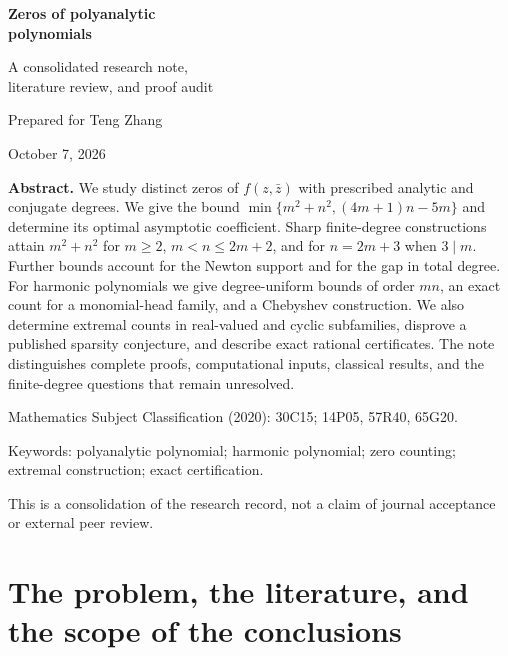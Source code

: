\documentclass[UTF8,11pt]{ctexart}
\theoremstyle{definition}
\numberwithin{equation}{section}
\begin{document}
\begin{titlepage}
\centering
\vspace*{1.8cm}
{\Huge\bfseries\color{MidnightBlue} Zeros of polyanalytic\\[0.25em] polynomials\par}
\vspace{0.8cm}
{\Large A consolidated research note,\\[0.25em] literature review, and proof audit\par}
\vspace{1.2cm}
{\large Prepared for Teng Zhang\par}
\vspace{0.5cm}
{\large October 7, 2026\par}
\vfill
\begin{tcolorbox}[colback=MidnightBlue!4,colframe=MidnightBlue!50,sharp corners,boxrule=0.5pt,width=0.94\textwidth]
\textbf{Abstract.}
We study distinct zeros of $f(z,\bar z)$ with prescribed analytic and conjugate degrees. We give the bound
$\min\{m^2+n^2,(4m+1)n-5m\}$ and determine its optimal asymptotic coefficient. Sharp finite-degree constructions attain $m^2+n^2$ for $m\ge2$, $m<n\le2m+2$, and for $n=2m+3$ when $3\mid m$. Further bounds account for the Newton support and for the gap in total degree. For harmonic polynomials we give degree-uniform bounds of order $mn$, an exact count for a monomial-head family, and a Chebyshev construction. We also determine extremal counts in real-valued and cyclic subfamilies, disprove a published sparsity conjecture, and describe exact rational certificates. The note distinguishes complete proofs, computational inputs, classical results, and the finite-degree questions that remain unresolved.
\end{tcolorbox}
\vspace{0.6cm}
{\small Mathematics Subject Classification (2020): 30C15; 14P05, 57R40, 65G20.\par}
{\small Keywords: polyanalytic polynomial; harmonic polynomial; zero counting; extremal construction; exact certification.\par}
\vfill
{\small This is a consolidation of the research record, not a claim of journal acceptance or external peer review.\par}
\end{titlepage}
\tableofcontents
\newpage
\section{The problem, the literature, and the scope of the conclusions}\label{sec:intro}
\end{document}
